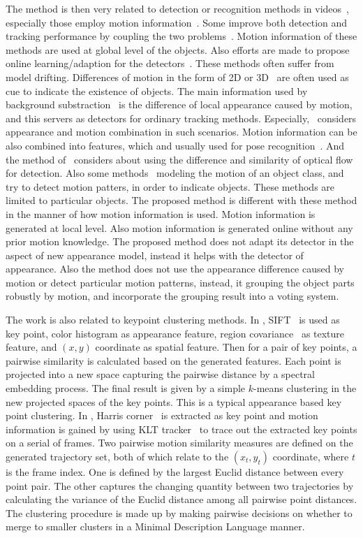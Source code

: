 The method is then very related to detection or recognition methods in videos~\citep{vd4,vd5,vd6}, especially those employ motion information~\citep{vd1,vd2,vd3}. Some  improve both detection and tracking performance by coupling the two problems~\citep{vd1,vd2,vd3}. Motion information of these methods are used at global level of the objects. Also efforts are made to propose online learning/adaption for the detectors~\citep{vd4,vd5,vd6,dldt}. These methods often suffer from model drifting. Differences of motion in the form of 2D or 3D~\citep{my3} are often used as cue to indicate the existence of objects. The main information used by background substraction~\citep{bs1} is the difference of local appearance caused by motion, and this servers as detectors for ordinary tracking methods. Especially,~\citep{pvm} considers appearance and motion combination in such scenarios. Motion information can be also combined into features, which and  usually used for pose recognition~\citep{mafea}.  And the method of~\citep{ac9} considers about using the difference and similarity of optical flow for detection. Also some methods~\citep{maaa} modeling the motion of an object class, and try to detect motion patters, in order to indicate objects. These methods are limited to particular objects. The proposed method is different with these method in the manner of how motion information is used. Motion information is generated at local level. Also motion information is generated online without any prior motion knowledge. The proposed method does not adapt its detector in the aspect of new appearance model, instead it helps with the detector of appearance. Also the method does not use the appearance difference caused by motion or detect particular motion patterns, instead, it grouping the object parts robustly by motion, and incorporate the grouping result into a voting system.

The work is also related to keypoint clustering methods. In \citep{mc}, SIFT~\citep{o12} is
used as key point, color histogram as appearance feature, region covariance~\citep{regionc}
as texture feature, and $(x,y)$ coordinate as spatial feature. Then
for a pair of key points, a pairwise similarity is calculated based
on the generated features. Each point is projected into a new space
capturing the pairwise distance by a spectral embedding process. The
final result is given by a simple $k$-means clustering in the new
projected spaces of the key points. This is a typical
appearance based key point clustering. In \citep{my9}, Harris
corner~\citep{ij2} is extracted as key point and motion information is
gained by using KLT tracker~\citep{ij3} to trace out the extracted key
points on a serial of frames. Two pairwise motion similarity
measures are defined on the generated trajectory set, both of which
relate to the $(x_t,y_t)$ coordinate, where $t$ is the frame index.
One is defined by the largest Euclid distance between every point
pair. The other captures the changing quantity between two
trajectories by calculating the variance of the Euclid distance
among all pairwise point distances. The clustering procedure is made
up by making pairwise decisions on whether to merge to smaller
clusters in a Minimal Description Language manner.


